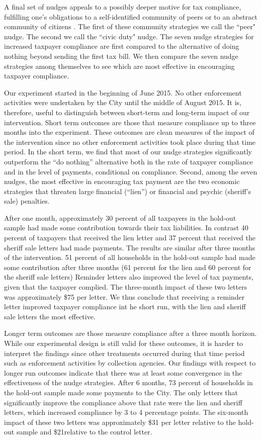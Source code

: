 \documentclass[12pt]{article}
\begin{document}
A final set of nudges appeals to a possibly deeper motive for tax
compliance, fulfilling one's obligations to a self-identified
community of peers \cite{Posner-00} or to an abstract community of
citizens \cite{Rawls-71}.  The first of these community strategies we
call the ``peer" nudge.  The second we call the ``civic duty" nudge.  
The seven nudge strategies for increased taxpayer compliance are first
compared to the alternative of doing nothing beyond sending the first
tax bill.  We then compare the seven nudge strategies among themselves
to see which are most effective in encouraging taxpayer compliance.

Our experiment started in the beginning of June 2015. No other enforcement
activities were undertaken by the City until the middle of August
2015. It is, therefore, useful to distinguish between short-term and
long-term impact of our intervention. Short term outcomes are those
that measure compliance up to three months into the experiment. These
outcomes are clean measures of the impact of the intervention since no
other enforcement activities took place during that time period.  In
the short term, we find that most of our nudge strategies
significantly outperform the ``do nothing'' alternative both in the
rate of taxpayer compliance and in the level of payments, conditional
on compliance.  Second, among the seven nudges, the most effective in
encouraging tax payment are the two economic strategies that threaten
large financial (``lien'') or financial and psychic (sheriff's sale)
penalties.

After one month, approximately 30 percent of all taxpayers in the
hold-out sample had made some contribution towards their tax
liabilities. In contrast 40 percent of taxpayers that received the
lien letter and 37 percent that received the sheriff sale letters had
made payments. The results are similar after three months of the
intervention.  51 percent of all households in the hold-out sample had
made some contribution after three months (61 percent for the lien and
60 percent for the sheriff sale letters) Reminder letters also
improved the level of tax payments, given that the taxpayer
complied. The three-month impact of these two letters was
approximately \$75 per letter. We thus conclude that receiving a
reminder letter improved taxpayer compliance int he short run, with
the lien and sheriff sale letters the most effective.

Longer term outcomes are those measure compliance after a three month
horizon. While our experimental design is still valid for these
outcomes, it is harder to interpret the findings since other
treatments occurred during that time period such as enforcement
activities by collection agencies. Our findings with respect to longer
run outcomes indicate that there was at least some convergence in the
effectiveness of the nudge strategies. After 6 months, 73 percent of
households in the hold-out sample made some payments to the City. The
only letters that significantly improve the compliance above that rate
were the lien and sheriff letters, which increased compliance by 3 to
4 percentage points. The six-month impact of these two letters was
approximately \$31 per letter relative to the hold-out sample and
\$21relative to the control letter. 
\end{document}
